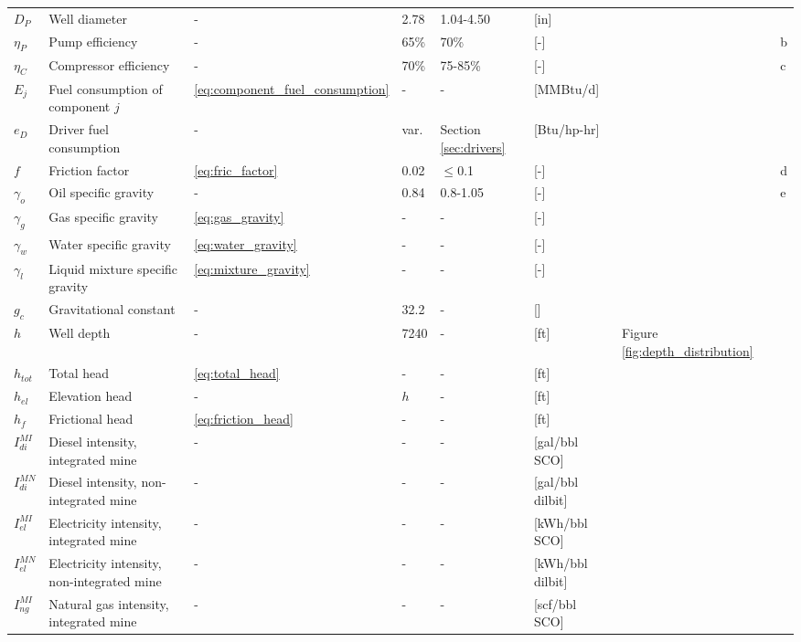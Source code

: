\documentclass[11pt]{report}
\begin{document}
{\begin{landscape}
\begin{scriptsize}
\begin{supertabular*}{1\columnwidth}{p{0.05\columnwidth}p{0.25\columnwidth}p{0.05\columnwidth}p{0.1\columnwidth}p{0.1\columnwidth}p{0.15\columnwidth}p{0.085\columnwidth}p{0.045\columnwidth}}
$D_{P}$ & Well diameter & - & 2.78 & 1.04-4.50 & [\unit{in}] & \cite[p. 121]{Clegg2007} & \\
$\eta_{P}$ & Pump efficiency & - & 65\% & 70\% & [-] & \cite[p. 27]{Rose1989} & b \\
$\eta_{C}$ & Compressor efficiency & - & 70\% & 75-85\% & [-] & \cite[p. 105]{Jarrell2002} & c \\
$E_{j}$ & Fuel consumption of component $j$ & \eqref{eq:component_fuel_consumption} & - & - & [MMBtu/d] & & \\
$e_{D}$ & Driver fuel consumption & - & var. & Section\,\ref{sec:drivers} & [Btu/hp-hr] & & \\
$f$ & Friction factor & \eqref{eq:fric_factor} & 0.02 & $\leq$0.1 & [-] & & d \\
$\gamma_{o} $ & Oil specific gravity & - & 0.84 & 0.8-1.05 & [-] & \cite{Schmidt1985} & e\\ 
$\gamma _{g}$ & Gas specific gravity & \eqref{eq:gas_gravity} & - & - & [-] & \cite[p. 10]{Takacs2005} & \\
$\gamma _{w}$ & Water specific gravity & \eqref{eq:water_gravity} & - & - & [-] & \cite[p. I-481]{Fanchi2007} & \\
$\gamma _{l}$ & Liquid mixture specific gravity & \eqref{eq:mixture_gravity} & - & - & [-] & \cite{Takacs2005} & \\
$g_{c}$ & Gravitational constant & - & 32.2 & - & [] & & \\
$h$ & Well depth & - & 7240 & - & [ft] & Figure\,\ref{fig:depth_distribution} & \\
$h_{tot}$ & Total head & \eqref{eq:total_head} & - & - & [ft] & & \\
$h_{el}$ & Elevation head & - & $h$ & - & [ft] & & \\
$h_{f}$ & Frictional head & \eqref{eq:friction_head} & - & - & [ft] & \cite[p. 447]{Mcallister2009} & \\
$I_{di}^{MI}$ & Diesel  intensity, integrated mine & - & - & - & [gal/bbl SCO] &  & \\
$I_{di}^{MN}$ & Diesel  intensity, non-integrated mine & - & - & - & [gal/bbl dilbit] &  & \\
$I_{el}^{MI}$ & Electricity  intensity, integrated mine & - & - & - & [kWh/bbl SCO] &  & \\
$I_{el}^{MN}$ & Electricity intensity, non-integrated mine & - & - & - & [kWh/bbl dilbit] & & \\
$I_{ng}^{MI}$ &Natural gas intensity, integrated mine & - & - & - & [scf/bbl SCO] &  & \\

\end{supertabular*}
\end{scriptsize}
\end{landscape}}
\end{document}
